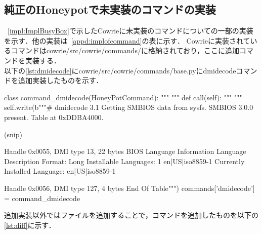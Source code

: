\subsection{純正のHoneypotで未実装のコマンドの実装}
~\ref{impl:ImplBusyBox}で示したCowrieに未実装のコマンドについての一部の実装を示す．他の実装は~\ref{appd:implofcommand}の表に示す．
Cowrieに実装されているコマンドはcowrie/src/cowrie/commands/に格納されており，ここに追加コマンドを実装する．\\

以下の\ref{lst:dmidecode}にcowrie/src/cowrie/commands/base.pyにdmidecodeコマンドを追加実装したものを示す．\cite{dmidecode}

\begin{mylisting}[label={lst:dmidecode},language=sh,caption=dmidecode]
class command_dmidecode(HoneyPotCommand):
    """
    """
    def call(self):
        """
        """
        self.write(b"""# dmidecode 3.1
Getting SMBIOS data from sysfs.
SMBIOS 3.0.0 present.
Table at 0xDDBA4000.

(snip)

Handle 0x0055, DMI type 13, 22 bytes
BIOS Language Information
    Language Description Format: Long
    Installable Languages: 1
        en|US|iso8859-1
    Currently Installed Language: en|US|iso8859-1

Handle 0x0056, DMI type 127, 4 bytes
End Of Table\n""")
commands['dmidecode'] = command_dmidecode
\end{mylisting}

追加実装以外ではファイルを追加することで，コマンドを追加したものを以下の\ref{lst:diff}に示す．\cite{diffcommand}

